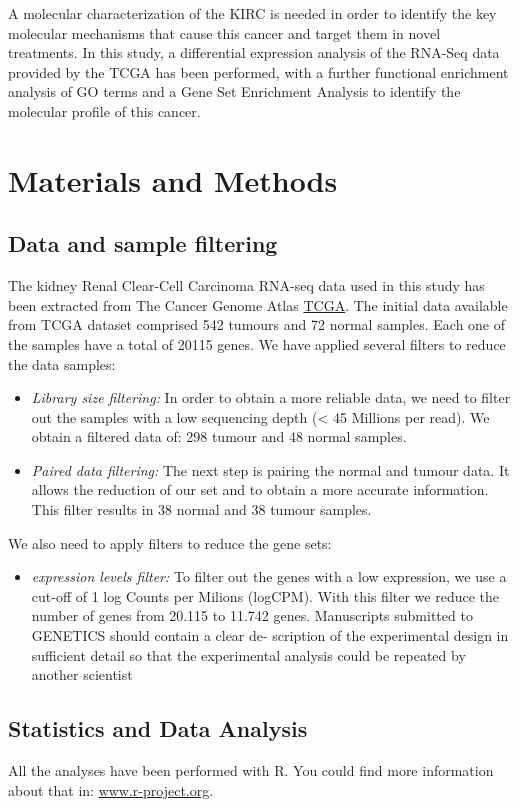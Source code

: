 \documentclass[9pt,twocolumn,twoside]{gsajnl}
\begin{document}
A molecular characterization of the KIRC is needed in order to identify the key molecular mechanisms that cause this cancer and target them in novel treatments. In this study,  a differential expression analysis of the RNA-Seq data provided by the TCGA has been performed, with a further functional enrichment analysis of GO terms and a Gene Set Enrichment Analysis to identify the molecular profile of this cancer.

\section*{Materials and Methods}

\subsection*{Data and sample filtering}
The kidney Renal Clear-Cell Carcinoma RNA-seq data used in this study has been extracted from The Cancer Genome Atlas \href{http://www.cancergenome.nih.gov}{TCGA}. The initial data available from TCGA dataset comprised 542 tumours and 72 normal samples. Each one of the samples have a total of 20115 genes. We have applied several filters to reduce the data samples:
\begin{itemize}
\item \textit{ Library size filtering:} In order to obtain a more reliable data, we need to filter out the samples with a low sequencing depth (< 45 Millions per read). We obtain a filtered data of: 298 tumour and 48 normal samples.
\item \textit{Paired data filtering:} The next step is pairing the normal and tumour data. It allows the reduction of our set and to obtain a more accurate information. This filter results in 38 normal and 38 tumour samples.
\end{itemize}
We also need to apply filters to reduce the gene sets:
\begin{itemize}
\item \textit{ expression levels filter:} To filter out the genes with a low expression, we use a cut-off of 1 log Counts per Milions (logCPM). With this filter we reduce the number of genes from 20.115 to 11.742 genes.
Manuscripts submitted to GENETICS should contain a clear de- scription of the experimental design in sufficient detail so that the experimental analysis could be repeated by another scientist
\end{itemize}

\subsection*{Statistics and Data Analysis } 
All the analyses have been performed with R. You could find more information about that in: \url{www.r-project.org}.
\end{document}
